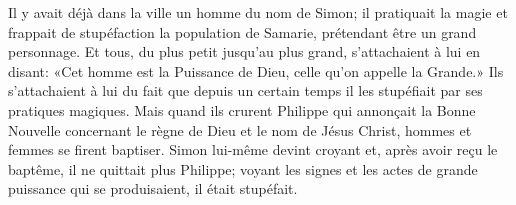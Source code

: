 Il y avait déjà dans la ville un homme du nom de Simon;
	il pratiquait la magie et frappait de stupéfaction la population de Samarie,
	prétendant être un grand personnage.
Et tous, du plus petit jusqu’au plus grand, s’attachaient à lui en disant:
	«Cet homme est la Puissance de Dieu, celle qu’on appelle la Grande.»
Ils s’attachaient à lui du fait que depuis un certain temps
	il les stupéfiait par ses pratiques magiques.
Mais quand ils crurent Philippe
	qui annonçait la Bonne Nouvelle concernant le règne de Dieu
		et le nom de Jésus Christ,
	hommes et femmes se firent baptiser.
Simon lui-même devint croyant et, après avoir reçu le baptême,
	il ne quittait plus Philippe;
	voyant les signes et les actes de grande puissance qui se produisaient,
	il était stupéfait.
